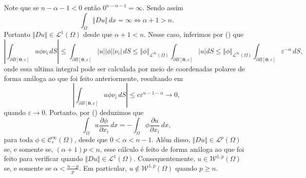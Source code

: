 \documentclass[a4paper, 11pt]{book}
\theoremstyle{definition}
\newcommand{\cC}{\mathcal{C}}
\newcommand{\cL}{\mathcal{L}}
\newcommand{\cW}{\mathcal{W}}
\begin{document}
\begin{ex}
\[    \]
    Note que se $n - \alpha - 1 < 0$ então $0^{n-\alpha-1} = \infty$. Sendo assim
    \[
        \int_\Omega \Vert Du \Vert \, dx = \infty \iff \alpha + 1 > n.
    \]
    Portanto $\Vert Du \Vert \in \cL^1(\Omega)$ desde que $\alpha + 1 < n$.
    Nesse caso, inferimos por () que
    \[
        \left| \int_{\partial B[\mathbf{0},\varepsilon]} u \phi \nu_i \,dS \right| \leqslant 
        \int_{\partial B[\mathbf{0},\varepsilon]} |u| |\phi| |\nu_i| \,dS \leqslant \Vert \phi \Vert_{\cL^\infty(\Omega)}\int_{\partial B[\mathbf{0},\varepsilon]} |u|dS \leqslant \Vert \phi \Vert_{\cL^\infty(\Omega)}\int_{\partial B[\mathbf{0},\varepsilon]} \varepsilon^{-\alpha} \,dS,
    \]
    onde essa ultima integral pode ser calculada por meio de coordenadas polares de forma análoga ao que foi feito anteriormente, resultando em
    \[
        \left| \int_{\partial B[\mathbf{0},\varepsilon]} u \phi \nu_i \,dS \right| \leqslant c \varepsilon^{n-1-\alpha} \to 0,
    \]
    quando $\varepsilon \to 0$. Portanto, por () deduzimos que
    \[
        \int_{\Omega} u \dfrac{\partial \phi}{\partial x_i} \, dx = -\int_{\Omega} \phi \dfrac{\partial u}{\partial x_i} \,dx,
    \]
    para toda $\phi \in \cC^\infty_c(\Omega)$, desde que $0 < \alpha < n-1$. 
    Além disso, $\Vert Du \Vert \in \cL^p(\Omega)$ se, e somente se, $(\alpha + 1)p < n$, esse cálculo é feito de forma análoga ao que foi feito para verificar quando $\Vert Du \Vert \in \cL^1(\Omega)$. Consequentemente, $u \in \cW^{1,p}(\Omega)$ se, e somente se $\alpha < \frac{n-p}{p}$.
    Em particular, $u \not\in \cW^{1,p}(\Omega)$ quando $p \geqslant n$.
\end{ex}
\end{document}
